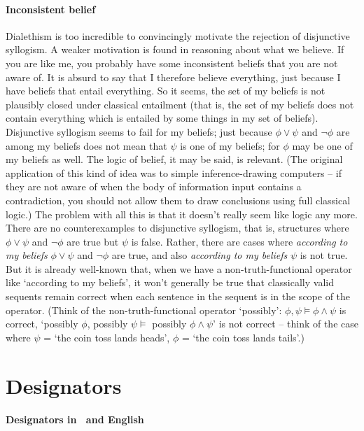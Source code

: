  \paragraph{Inconsistent belief} Dialethism is too incredible to convincingly motivate the rejection of disjunctive syllogism. A weaker motivation is found in reasoning about what we believe. If you are like me, you probably have some inconsistent beliefs that you are not aware of. It is absurd to say that I therefore believe everything, just because I have beliefs that entail everything. So it seems, the set of my beliefs is not plausibly closed under classical entailment (that is, the set of my beliefs does not contain everything which is  entailed by some things in my set of beliefs). Disjunctive syllogism seems to fail for my beliefs; just because $\phi\vee\psi$ and $\neg\phi$ are among my beliefs does not mean that $\psi$ is one of my beliefs; for $\phi$ may be one of my beliefs as well. The logic of belief, it may be said, is relevant. (The original application of this kind of idea was to simple inference-drawing computers – if they are not aware of when the body of information input contains a contradiction, you should not allow them to draw conclusions using full classical logic.) The problem with all this is that it doesn't really seem like logic any more. There are no counterexamples to disjunctive syllogism, that is, structures where $\phi\vee\psi$ and $\neg\phi$ are true but $\psi$ is false. Rather, there are cases where \emph{according to my beliefs} $\phi \vee \psi$ and $\neg\phi$ are true, and also \emph{according to my beliefs} $\psi$ is not true. But it is already well-known that, when we have a non-truth-functional operator like `according to my beliefs', it won't generally be true that classically valid sequents remain correct when each sentence in the sequent is in the scope of the operator. (Think of the non-truth-functional operator `possibly': $\phi, \psi \vDash \phi \wedge \psi$ is correct, `possibly $\phi$, possibly $\psi \vDash$ possibly $\phi \wedge \psi$' is not correct – think of the case where $\psi$ = `the coin toss lands heads', $\phi$ = `the coin toss lands tails'.) 



\section{Designators}
\paragraph{Designators in \ltwo\ and English}

